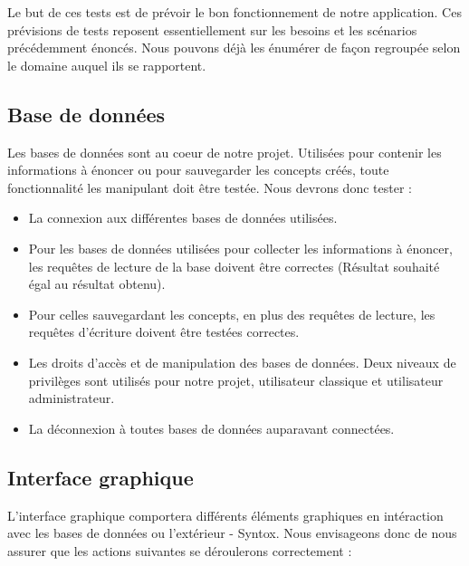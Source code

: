\documentclass[12pt]{report}
\begin{document}
Le but de ces tests est de prévoir le bon fonctionnement de notre application. Ces prévisions de tests reposent essentiellement sur les besoins et les scénarios précédemment énoncés. Nous pouvons déjà les énumérer de façon regroupée selon le domaine auquel ils se rapportent.

\subsection{Base de données}

Les bases de données sont au coeur de notre projet. Utilisées pour contenir les informations à énoncer ou pour sauvegarder les concepts créés, toute fonctionnalité les manipulant doit être testée.
Nous devrons donc tester :
	\begin{itemize}
	\item La connexion aux différentes bases de données utilisées. 
	\item Pour les bases de données utilisées pour collecter les informations à énoncer, les requêtes de lecture de la base doivent être correctes (Résultat souhaité égal au résultat obtenu).
	\item Pour celles sauvegardant les concepts, en plus des requêtes de lecture, les requêtes d'écriture doivent être testées correctes. 
	\item Les droits d'accès et de manipulation des bases de données. Deux niveaux de privilèges sont utilisés pour notre projet, utilisateur classique et utilisateur administrateur. 
	\item La déconnexion à toutes bases de données auparavant connectées.

	\end{itemize}
	
\subsection{Interface graphique}

L'interface graphique comportera différents éléments graphiques en intéraction avec les bases de données ou l'extérieur - Syntox. Nous envisageons donc de nous assurer que les actions suivantes se déroulerons correctement :
\end{document}
